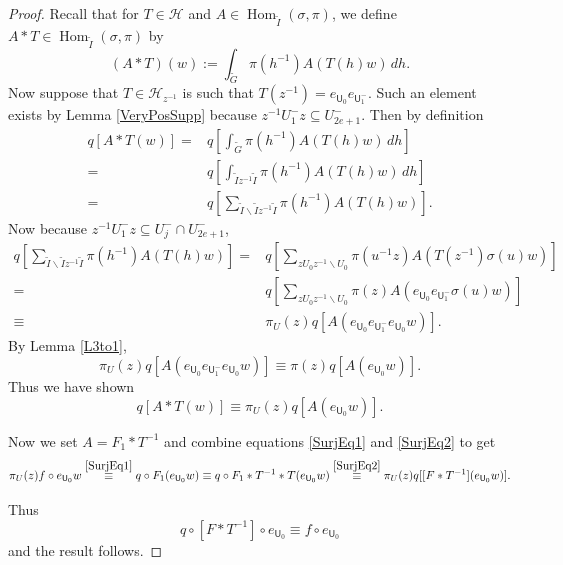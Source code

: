 \documentclass[10pt,a4paper]{amsart}
\newcommand{\Gt}{\widetilde{G}}
\newcommand{\Hcal}{\mathcal{H}}
\newcommand{\Hom}{\operatorname{Hom}}
\newcommand{\It}{\widetilde{I}}
\newcommand{\Uf}{\mathsf{U}}
\begin{document}
\begin{proof}
	Recall that for $T\in \Hcal$ and $A\in \Hom_{\It}(\sigma,\pi)$, we define $A*T\in\Hom_{\It}(\sigma,\pi)$ by
    \[
    (A*T)(w):=\int_{\Gt}\pi(h^{-1})A(T(h)w)\,dh.
    \]
    Now suppose that $T\in \Hcal_{z^{-1}}$ is such that $T(z^{-1})=e_{{\Uf}_{0}}e_{{\Uf}^{-}_{1}}$. Such an element exists by Lemma \ref{VeryPosSupp} because $z^{-1}U^{-}_{1}z\subseteq U^{-}_{2e+1}$. Then by definition 
	\begin{align*}
		q[A*T(w)] =&q[ \int_{\Gt}\pi(h^{-1})A(T(h)w)\,dh]\\
		=& q[\int_{\It z^{-1}\It}\pi(h^{-1})A(T(h)w)\,dh]\\
		=& q[\sum_{\It\backslash \It z^{-1}\It}\pi(h^{-1})A(T(h)w)].
	\end{align*}
	Now because $z^{-1}U^{-}_{1}z\subseteq U^{-}_{j}\cap U^{-}_{2e+1}$,
	\begin{align*}
		q[\sum_{\It\backslash \It z^{-1}\It}\pi(h^{-1})A(T(h)w)] =& q[\sum_{zU_{0}z^{-1}\backslash U_{0}}\pi(u^{-1}z)A(T(z^{-1})\sigma(u)w)]\\
		=& q[\sum_{zU_{0}z^{-1}\backslash U_{0}}\pi(z)A(e_{{\Uf}_{0}}e_{{\Uf}^{-}_{1}}\sigma(u)w)]\\
		\equiv&\pi_{U}(z)q[A(e_{{\Uf}_{0}}e_{{\Uf}^{-}_{1}}e_{{\Uf}_{0}}w)].
	\end{align*}
	By Lemma \ref{L3to1},
	\begin{equation*}
	\pi_{U}(z)q[A(e_{{\Uf}_{0}}e_{{\Uf}^{-}_{1}}e_{{\Uf}_{0}}w)]\equiv\pi(z)q[A(e_{{\Uf}_{0}}w)].
	\end{equation*}
	Thus we have shown
	\begin{equation}\label{SurjEq2}
		q[A*T(w)] \equiv\pi_{U}(z)q[A(e_{{\Uf}_{0}}w)].
	\end{equation}
	
	Now we set $A=F_1*T^{-1}$ and combine equations \eqref{SurjEq1} and \eqref{SurjEq2} to get 
    \begin{equation*}
		\pi_{U}(z)f \circ e_{{\Uf}_{0}}w\stackrel{\eqref{SurjEq1}}{\equiv}q\circ F_1(e_{{\Uf}_{0}}w)\equiv q\circ F_1*T^{-1}*T(e_{{\Uf}_{0}}w)\stackrel{\eqref{SurjEq2}}{\equiv}\pi_{U}(z)q[[F*T^{-1}](e_{{\Uf}_{0}}w)].
	\end{equation*}
	
	Thus 
	\begin{equation*}
		q\circ [F*T^{-1}]\circ e_{{\Uf}_{0}}\equiv f\circ e_{{\Uf}_{0}}
	\end{equation*}
	and the result follows.
\end{proof}
\end{document}
